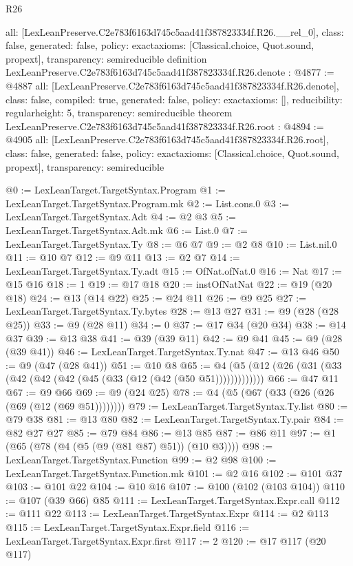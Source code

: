 \begin{lexlean}{R26}
\begin{coremodule}
{  all: [LexLeanPreserve.C2e783f6163d745c5aad41f387823334f.R26.__rel_0],
  class: false,
  generated: false,
  policy: exact{axioms: [Classical.choice, Quot.sound, propext]},
  transparency: semireducible
}
definition LexLeanPreserve.C2e783f6163d745c5aad41f387823334f.R26.denote : @4877 := @4887 {
  all: [LexLeanPreserve.C2e783f6163d745c5aad41f387823334f.R26.denote],
  class: false,
  compiled: true,
  generated: false,
  policy: exact{axioms: []},
  reducibility: regular{height: 5},
  transparency: semireducible
}
theorem LexLeanPreserve.C2e783f6163d745c5aad41f387823334f.R26.root : @4894 := @4905 {
  all: [LexLeanPreserve.C2e783f6163d745c5aad41f387823334f.R26.root],
  class: false,
  generated: false,
  policy: exact{axioms: [Classical.choice, Quot.sound, propext]},
  transparency: semireducible
}

@0 := LexLeanTarget.TargetSyntax.Program
@1 := LexLeanTarget.TargetSyntax.Program.mk
@2 := List.cons.{0}
@3 := LexLeanTarget.TargetSyntax.Adt
@4 := @2 @3
@5 := LexLeanTarget.TargetSyntax.Adt.mk
@6 := List.{0}
@7 := LexLeanTarget.TargetSyntax.Ty
@8 := @6 @7
@9 := @2 @8
@10 := List.nil.{0}
@11 := @10 @7
@12 := @9 @11
@13 := @2 @7
@14 := LexLeanTarget.TargetSyntax.Ty.adt
@15 := OfNat.ofNat.{0}
@16 := Nat
@17 := @15 @16
@18 := 1
@19 := @17 @18
@20 := instOfNatNat
@22 := @19 (@20 @18)
@24 := @13 (@14 @22)
@25 := @24 @11
@26 := @9 @25
@27 := LexLeanTarget.TargetSyntax.Ty.bytes
@28 := @13 @27
@31 := @9 (@28 (@28 @25))
@33 := @9 (@28 @11)
@34 := 0
@37 := @17 @34 (@20 @34)
@38 := @14 @37
@39 := @13 @38
@41 := @39 (@39 @11)
@42 := @9 @41
@45 := @9 (@28 (@39 @41))
@46 := LexLeanTarget.TargetSyntax.Ty.nat
@47 := @13 @46
@50 := @9 (@47 (@28 @41))
@51 := @10 @8
@65 := @4 (@5 (@12 (@26 (@31 (@33 (@42 (@42 (@42 (@45 (@33 (@12 (@42 (@50 @51)))))))))))))
@66 := @47 @11
@67 := @9 @66
@69 := @9 (@24 @25)
@78 := @4 (@5 (@67 (@33 (@26 (@26 (@69 (@12 (@69 @51))))))))
@79 := LexLeanTarget.TargetSyntax.Ty.list
@80 := @79 @38
@81 := @13 @80
@82 := LexLeanTarget.TargetSyntax.Ty.pair
@84 := @82 @27 @27
@85 := @79 @84
@86 := @13 @85
@87 := @86 @11
@97 := @1 (@65 (@78 (@4 (@5 (@9 (@81 @87) @51)) (@10 @3))))
@98 := LexLeanTarget.TargetSyntax.Function
@99 := @2 @98
@100 := LexLeanTarget.TargetSyntax.Function.mk
@101 := @2 @16
@102 := @101 @37
@103 := @101 @22
@104 := @10 @16
@107 := @100 (@102 (@103 @104))
@110 := @107 (@39 @66) @85
@111 := LexLeanTarget.TargetSyntax.Expr.call
@112 := @111 @22
@113 := LexLeanTarget.TargetSyntax.Expr
@114 := @2 @113
@115 := LexLeanTarget.TargetSyntax.Expr.field
@116 := LexLeanTarget.TargetSyntax.Expr.first
@117 := 2
@120 := @17 @117 (@20 @117)

\end{coremodule}
\end{lexlean}
